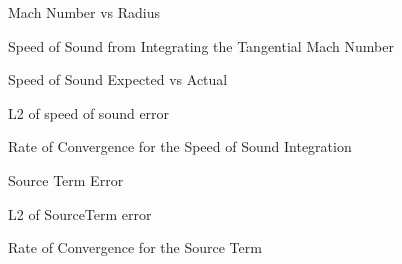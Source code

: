 \documentclass[a4paper]{article}
\begin{document}
\begin{figure}
    \begin{center}
        \scalebox{0.75}{}
    \end{center}
    \caption{Mach Number vs Radius}
\end{figure}

\begin{figure}
    \begin{center}
        \scalebox{0.75}{}
    \end{center}
    \caption{Speed of Sound from Integrating the Tangential Mach Number}
\end{figure}

\begin{figure}
    \begin{center}
        \scalebox{0.75}{}
    \end{center}
    \caption{Speed of Sound Expected vs Actual}
\end{figure}

\begin{figure}
    \begin{center}
        \scalebox{0.75}{}
    \end{center}
    \caption{L2 of speed of sound error}
\end{figure}


\begin{figure}
    \begin{center}
        \scalebox{0.75}{}
    \end{center}
    \caption{Rate of Convergence for the Speed of Sound Integration}
\end{figure}

\begin{figure}
    \begin{center}
        \scalebox{0.75}{}
    \end{center}
    \caption{Source Term Error}
\end{figure}

\begin{figure}
    \begin{center}
        \scalebox{0.75}{}
    \end{center}
    \caption{L2 of SourceTerm error}
\end{figure}

\begin{figure}
   \begin{center}
       \scalebox{0.75}{}
    \end{center}
    \caption{Rate of Convergence for the Source Term}
\end{figure}
\end{document}
